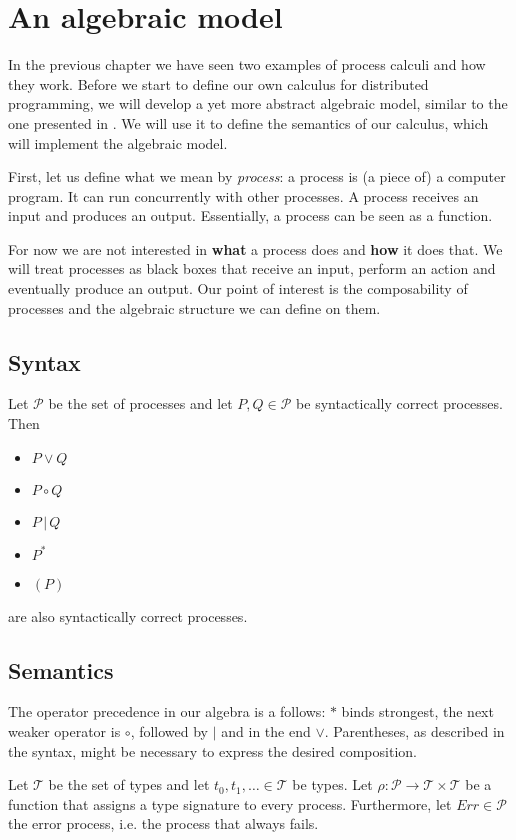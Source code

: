 \chapter{An algebraic model}
In the previous chapter we have seen two examples of process calculi and how they work. Before we start to define our own calculus for distributed programming, we will develop a yet more abstract algebraic model, similar to the one presented in \cite{Hoare:2012:LPU:2368298.2368301}. We will use it to define the semantics of our calculus, which will implement the algebraic model.

First, let us define what we mean by \textit{process}: a process is (a piece of) a computer program. It can run concurrently with other processes. A process receives an input and produces an output. Essentially, a process can be seen as a function. %

For now we are not interested in \textbf{what} a process does and \textbf{how} it does that. We will treat processes as black boxes that receive an input, perform an action and eventually produce an output. Our point of interest is the composability of processes and the algebraic structure we can define on them.

\section{Syntax}

Let $\mathcal{P}$ be the set of processes and let $P, Q \in \mathcal{P}$ be syntactically correct processes. Then
\begin{itemize}
  \item $P \vee Q$
  \item $P \circ Q$
  \item $P \,|\, Q$
  \item $P^*$
  \item $\left( P \right)$
\end{itemize}
are also syntactically correct processes.

\section{Semantics}
The operator precedence in our algebra is a follows: $*$ binds strongest, the next weaker operator is $\circ$, followed by $|$ and in the end $\vee$. Parentheses, as described in the syntax, might be necessary to express the desired composition.

Let $\mathcal{T}$ be the set of types and let $t_0, t_1, \ldots \in \mathcal{T}$ be types. Let $\rho \colon \mathcal{P} \to \mathcal{T} \times \mathcal{T}$ be a function that assigns a type signature to every process. Furthermore, let $Err \in \mathcal{P}$ the error process, i.e. the process that always fails.

